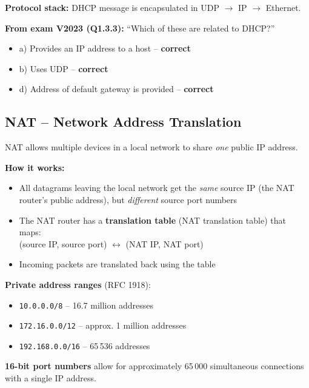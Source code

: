 \begin{exambox}
\medskip
\textbf{Protocol stack:} DHCP message is encapsulated in UDP $\rightarrow$ IP $\rightarrow$ Ethernet.

\medskip
\textbf{From exam V2023 (Q1.3.3):} ``Which of these are related to DHCP?''
\begin{itemize}[noitemsep]
    \item a) Provides an IP address to a host -- \textbf{correct}
    \item b) Uses UDP -- \textbf{correct}
    \item d) Address of default gateway is provided -- \textbf{correct}
\end{itemize}
\end{exambox}

\begin{imagebox}
\end{imagebox}

\subsection{NAT -- Network Address Translation}

\begin{keybox}
NAT allows multiple devices in a local network to share \emph{one} public IP address.

\textbf{How it works:}
\begin{itemize}[noitemsep]
    \item All datagrams leaving the local network get the \emph{same} source IP (the NAT router's public address), but \emph{different} source port numbers
    \item The NAT router has a \textbf{translation table} (NAT translation table) that maps: \\
    (source IP, source port) $\leftrightarrow$ (NAT IP, NAT port)
    \item Incoming packets are translated back using the table
\end{itemize}

\textbf{Private address ranges} (RFC 1918):
\begin{itemize}[noitemsep]
    \item \texttt{10.0.0.0/8} -- 16.7 million addresses
    \item \texttt{172.16.0.0/12} -- approx. 1 million addresses
    \item \texttt{192.168.0.0/16} -- 65\,536 addresses
\end{itemize}

\textbf{16-bit port numbers} allow for approximately 65\,000 simultaneous connections with a single IP address.
\end{keybox}

